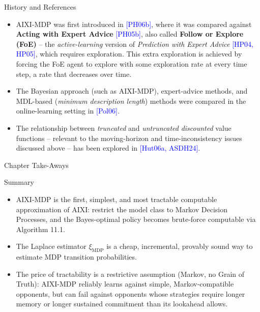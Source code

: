 \documentclass[aspectratio=169,10pt]{beamer}
\newcommand{\ximdp}{\xi_{\mathrm{MDP}}}
\begin{document}
\begin{frame}{History and References}
  \begin{itemize}
    \item AIXI-MDP was first introduced in \textcolor{blue}{[PH06b]}, where
      it was compared against \textbf{Acting with Expert Advice}
      \textcolor{blue}{[PH05b]}, also called \textbf{Follow or Explore
      (FoE)} -- the \emph{active-learning} version of \emph{Prediction with
      Expert Advice} \textcolor{blue}{[HP04, HP05]}, which requires
      exploration. This extra exploration is achieved by forcing the FoE
      agent to explore with some exploration rate at every time step, a
      rate that decreases over time.
    \item The Bayesian approach (such as AIXI-MDP), expert-advice methods,
      and MDL-based (\emph{minimum description length}) methods were
      compared in the online-learning setting in \textcolor{blue}{[Pol06]}.
    \item The relationship between \emph{truncated} and \emph{untruncated}
      \emph{discounted} value functions -- relevant to the moving-horizon
      and time-inconsistency issues discussed above -- has been explored in
      \textcolor{blue}{[Hut06a, ASDH24]}.
  \end{itemize}
\end{frame}

\begin{frame}{Chapter Take-Aways}
  \begin{block}{Summary}
    \begin{itemize}
      \item AIXI-MDP is the first, simplest, and most tractable computable
        approximation of AIXI: restrict the model class to Markov Decision
        Processes, and the Bayes-optimal policy becomes brute-force
        computable via Algorithm 11.1.
      \item The Laplace estimator $\ximdp$ is a cheap, incremental,
        provably sound way to estimate MDP transition probabilities.
      \item The price of tractability is a restrictive assumption (Markov,
        no Grain of Truth): AIXI-MDP reliably learns against simple,
        Markov-compatible opponents, but can fail against opponents whose
        strategies require longer memory or longer sustained commitment
        than its lookahead allows.
    \end{itemize}
  \end{block}
\end{frame}

\end{document}
